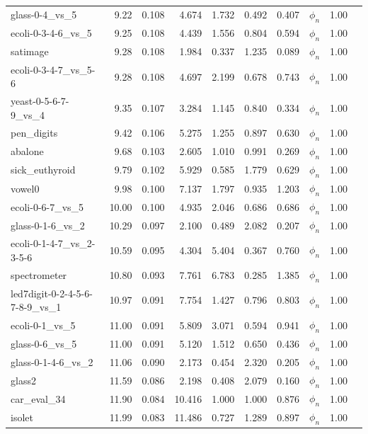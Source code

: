 \begin{longtable}{lrrrrrrrll}
    glass-0-4\_vs\_5 & 9.22 & 0.108 & 4.674 & 1.732 & 0.492 & 0.407 & $\phi_{n}$ & 1.00 \\
    ecoli-0-3-4-6\_vs\_5 & 9.25 & 0.108 & 4.439 & 1.556 & 0.804 & 0.594 & $\phi_{n}$ & 1.00 \\
    satimage & 9.28 & 0.108 & 1.984 & 0.337 & 1.235 & 0.089 & $\phi_{n}$ & 1.00 \\
    ecoli-0-3-4-7\_vs\_5-6 & 9.28 & 0.108 & 4.697 & 2.199 & 0.678 & 0.743 & $\phi_{n}$ & 1.00 \\
    yeast-0-5-6-7-9\_vs\_4 & 9.35 & 0.107 & 3.284 & 1.145 & 0.840 & 0.334 & $\phi_{n}$ & 1.00 \\
    pen\_digits & 9.42 & 0.106 & 5.275 & 1.255 & 0.897 & 0.630 & $\phi_{n}$ & 1.00 \\
    abalone & 9.68 & 0.103 & 2.605 & 1.010 & 0.991 & 0.269 & $\phi_{n}$ & 1.00 \\
    sick\_euthyroid & 9.79 & 0.102 & 5.929 & 0.585 & 1.779 & 0.629 & $\phi_{n}$ & 1.00 \\
    vowel0 & 9.98 & 0.100 & 7.137 & 1.797 & 0.935 & 1.203 & $\phi_{n}$ & 1.00 \\
    ecoli-0-6-7\_vs\_5 & 10.00 & 0.100 & 4.935 & 2.046 & 0.686 & 0.686 & $\phi_{n}$ & 1.00 \\
    glass-0-1-6\_vs\_2 & 10.29 & 0.097 & 2.100 & 0.489 & 2.082 & 0.207 & $\phi_{n}$ & 1.00 \\
    ecoli-0-1-4-7\_vs\_2-3-5-6 & 10.59 & 0.095 & 4.304 & 5.404 & 0.367 & 0.760 & $\phi_{n}$ & 1.00 \\
    spectrometer & 10.80 & 0.093 & 7.761 & 6.783 & 0.285 & 1.385 & $\phi_{n}$ & 1.00 \\
    led7digit-0-2-4-5-6-7-8-9\_vs\_1 & 10.97 & 0.091 & 7.754 & 1.427 & 0.796 & 0.803 & $\phi_{n}$ & 1.00 \\
    ecoli-0-1\_vs\_5 & 11.00 & 0.091 & 5.809 & 3.071 & 0.594 & 0.941 & $\phi_{n}$ & 1.00 \\
    glass-0-6\_vs\_5 & 11.00 & 0.091 & 5.120 & 1.512 & 0.650 & 0.436 & $\phi_{n}$ & 1.00 \\
    glass-0-1-4-6\_vs\_2 & 11.06 & 0.090 & 2.173 & 0.454 & 2.320 & 0.205 & $\phi_{n}$ & 1.00 \\
    glass2 & 11.59 & 0.086 & 2.198 & 0.408 & 2.079 & 0.160 & $\phi_{n}$ & 1.00 \\
    car\_eval\_34 & 11.90 & 0.084 & 10.416 & 1.000 & 1.000 & 0.876 & $\phi_{n}$ & 1.00 \\
    isolet & 11.99 & 0.083 & 11.486 & 0.727 & 1.289 & 0.897 & $\phi_{n}$ & 1.00 \\

\end{longtable}
